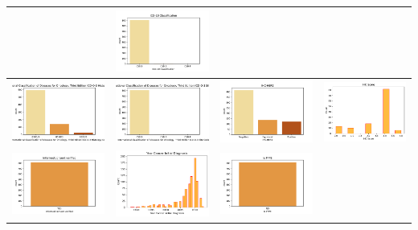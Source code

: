 \begin{center}
\begin{tabular}{ |c|c|c|c| }
		& \includegraphics[width=.25\textwidth]{NOTEBOOK/IMAGENES_CRUDAS/44} 
		\\  \hline 
		\includegraphics[width=.25\textwidth]{NOTEBOOK/IMAGENES_CRUDAS/45} 
		& \includegraphics[width=.25\textwidth]{NOTEBOOK/IMAGENES_CRUDAS/46} 
		& \includegraphics[width=.25\textwidth]{NOTEBOOK/IMAGENES_CRUDAS/47} 
		& \includegraphics[width=.25\textwidth]{NOTEBOOK/IMAGENES_CRUDAS/48} 
		\\  \hline
		\includegraphics[width=.25\textwidth]{NOTEBOOK/IMAGENES_CRUDAS/49} 
		& \includegraphics[width=.25\textwidth]{NOTEBOOK/IMAGENES_CRUDAS/50} 
		& \includegraphics[width=.25\textwidth]{NOTEBOOK/IMAGENES_CRUDAS/51} 

\end{tabular}
\end{center}
